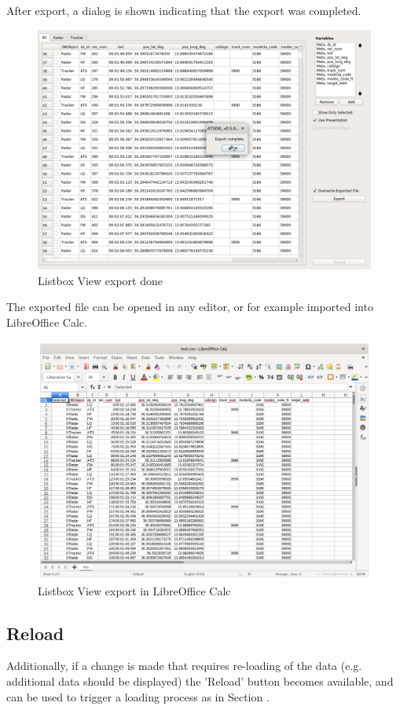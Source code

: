 After export, a dialog is shown indicating that the export was completed.

\begin{figure}[H]
  \center
    \includegraphics[width=18cm,frame]{../screenshots/listbox_exported.png}
  \caption{Listbox View export done}
\end{figure}

The exported file can be opened in any editor, or for example imported into LibreOffice Calc.

\begin{figure}[H]
    \hspace*{-2.5cm}
    \includegraphics[width=19cm]{../screenshots/listbox_exported_calc.png}
  \caption{Listbox View export in LibreOffice Calc}
\end{figure}
 
\subsection{Reload}

Additionally, if a change is made that requires re-loading of the data (e.g. additional data should be displayed) the 'Reload' button becomes available, and can be used to trigger a loading process as in Section . 
